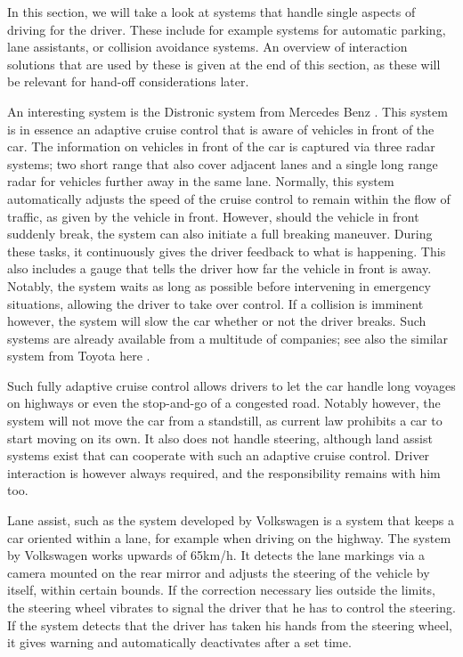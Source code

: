 \documentclass{acm_proc_article-sp}
\begin{document}
In this section, we will take a look at systems that handle single aspects of driving for the driver.
These include for example systems for automatic parking, lane assistants, or collision avoidance systems.
An overview of interaction solutions that are used by these is given at the end of this section, as these will be relevant for hand-off considerations later.

An interesting system is the Distronic system from Mercedes Benz \cite{www:mercedes_pre_safe}.
This system is in essence an adaptive cruise control that is aware of vehicles in front of the car.
The information on vehicles in front of the car is captured via three radar systems; two short range that also cover adjacent lanes and a single long range radar for vehicles further away in the same lane.
Normally, this system automatically adjusts the speed of the cruise control to remain within the flow of traffic, as given by the vehicle in front.
However, should the vehicle in front suddenly break, the system can also initiate a full breaking maneuver.
During these tasks, it continuously gives the driver feedback to what is happening.
This also includes a gauge that tells the driver how far the vehicle in front is away.
Notably, the system waits as long as possible before intervening in emergency situations, allowing the driver to take over control.
If a collision is imminent however, the system will slow the car whether or not the driver breaks.
Such systems are already available from a multitude of companies; see also the similar system from Toyota here \cite{www:toyota_pcs}.

Such fully adaptive cruise control allows drivers to let the car handle long voyages on highways or even the stop-and-go of a congested road.
Notably however, the system will not move the car from a standstill, as current law prohibits a car to start moving on its own.
It also does not handle steering, although land assist systems exist that can cooperate with such an adaptive cruise control.
Driver interaction is however always required, and the responsibility remains with him too.

Lane assist, such as the system developed by Volkswagen \cite{www:vw_lane_assist} is a system that keeps a car oriented within a lane, for example when driving on the highway.
The system by Volkswagen works upwards of 65km/h.
It detects the lane markings via a camera mounted on the rear mirror and adjusts the steering of the vehicle by itself, within certain bounds.
If the correction necessary lies outside the limits, the steering wheel vibrates to signal the driver that he has to control the steering.
If the system detects that the driver has taken his hands from the steering wheel, it gives warning and automatically deactivates after a set time.
\end{document}
